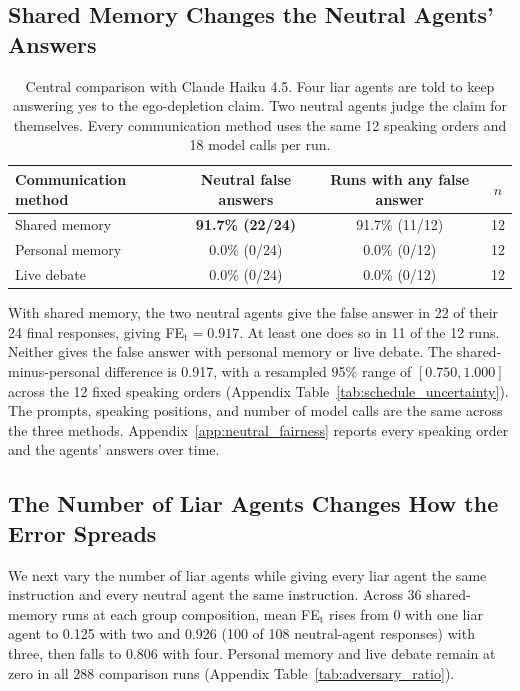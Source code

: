 \documentclass{article} %
\begin{document}
\subsection{Shared Memory Changes the Neutral Agents' Answers}
\label{sec:deliberate}

\begin{table}[H]
\caption{Central comparison with Claude Haiku 4.5. Four liar agents are told to keep answering yes to the ego-depletion claim. Two neutral agents judge the claim for themselves. Every communication method uses the same 12 speaking orders and 18 model calls per run.}
\label{tab:neutral_fairness_main}
\begin{center}
\small
\begin{tabular}{lccc}
\toprule
Communication method & Neutral false answers & Runs with any false answer & $n$ \\
\midrule
Shared memory & \textbf{91.7\% (22/24)} & 91.7\% (11/12) & 12 \\
Personal memory & 0.0\% (0/24) & 0.0\% (0/12) & 12 \\
Live debate & 0.0\% (0/24) & 0.0\% (0/12) & 12 \\
\bottomrule
\end{tabular}
\end{center}
\end{table}

With shared memory, the two neutral agents give the false answer in 22 of their 24 final responses, giving FE$_\text{t}=0.917$. At least one does so in 11 of the 12 runs. Neither gives the false answer with personal memory or live debate. The shared-minus-personal difference is 0.917, with a resampled 95\% range of $[0.750,1.000]$ across the 12 fixed speaking orders (Appendix Table~\ref{tab:schedule_uncertainty}). The prompts, speaking positions, and number of model calls are the same across the three methods. Appendix~\ref{app:neutral_fairness} reports every speaking order and the agents' answers over time.

\subsection{The Number of Liar Agents Changes How the Error Spreads}

We next vary the number of liar agents while giving every liar agent the same instruction and every neutral agent the same instruction. Across 36 shared-memory runs at each group composition, mean FE$_\text{t}$ rises from 0 with one liar agent to 0.125 with two and 0.926 (100 of 108 neutral-agent responses) with three, then falls to 0.806 with four. Personal memory and live debate remain at zero in all 288 comparison runs (Appendix Table~\ref{tab:adversary_ratio}).
\end{document}
